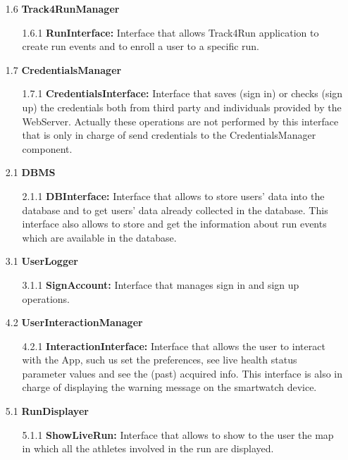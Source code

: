 \begin{center}
\begin{enumerate}
\item[1.6] \textbf{Track4RunManager}
	\begin{enumerate}[nolistsep]
		\item[1.6.1] \textbf{RunInterface:} Interface that allows Track4Run application to create run events and to enroll a user to a specific run. 
	\end{enumerate}
	
\item[1.7] \textbf{CredentialsManager}
	\begin{enumerate}[nolistsep]
		\item[1.7.1] \textbf{CredentialsInterface:} Interface that saves (sign in) or checks (sign up) the credentials both from third party and individuals provided by the WebServer. Actually these operations are not performed by this interface that is only in charge of send credentials to the CredentialsManager component.
	\end{enumerate}

\item[2.1] \textbf{DBMS}
	\begin{enumerate}[nolistsep]
		\item[2.1.1] \textbf{DBInterface:} Interface that allows to store users' data into the database and to get users' data already collected in the database. This interface also allows to store and get the information about run events which are available in the database.
	\end{enumerate}
	
\item[3.1] \textbf{UserLogger}
	\begin{enumerate}[nolistsep]
		\item[3.1.1] \textbf{SignAccount:} Interface that manages sign in and sign up operations.
	\end{enumerate}
	
\item[4.2] \textbf{UserInteractionManager}
	\begin{enumerate}[nolistsep]
		\item[4.2.1] \textbf{InteractionInterface:} Interface that allows the user to interact with the App, such us set the preferences, see live health status parameter values and see the (past) acquired info. This interface is also in charge of displaying the warning message on the smartwatch device.
	\end{enumerate}	
	
\item[5.1] \textbf{RunDisplayer}
	\begin{enumerate}[nolistsep]
		\item[5.1.1] \textbf{ShowLiveRun:} Interface that allows to show to the user the map in which all the athletes involved in the run are displayed.
	\end{enumerate}	


\end{enumerate}
\end{center}
